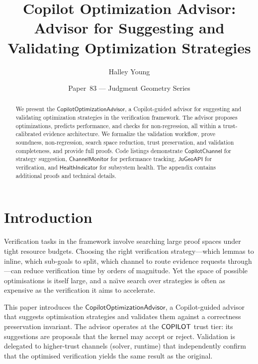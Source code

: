\documentclass[11pt]{article}
\title{\textbf{Copilot Optimization Advisor:\\ Advisor for Suggesting and Validating Optimization Strategies}}
\author{Halley Young}
\date{Paper~83 --- Judgment Geometry Series}
\newcommand{\OptAdv}{\mathsf{CopilotOptimizationAdvisor}}
\newcommand{\CopChan}{\mathsf{CopilotChannel}}
\newcommand{\ChanMon}{\mathsf{ChannelMonitor}}
\newcommand{\HealthInd}{\mathsf{HealthIndicator}}
\newcommand{\JuGeoAPI}{\mathsf{JuGeoAPI}}
\begin{document}
\maketitle

\begin{abstract}
We present the $\OptAdv$, a Copilot-guided advisor for suggesting and validating optimization strategies in the \JuGeo{} verification framework. The advisor proposes optimizations, predicts performance, and checks for non-regression, all within a trust-calibrated evidence architecture. We formalize the validation workflow, prove soundness, non-regression, search space reduction, trust preservation, and validation completeness, and provide full proofs. Code listings demonstrate $\CopChan$ for strategy suggestion, $\ChanMon$ for performance tracking, $\JuGeoAPI$ for verification, and $\HealthInd$ for subsystem health. The appendix contains additional proofs and technical details.
\end{abstract}

\section{Introduction}\label{sec:intro}

Verification tasks in the \JuGeo{} framework involve searching
large proof spaces under tight resource budgets.  Choosing
the right verification strategy---which lemmas to inline,
which sub-goals to split, which channel to route evidence
requests through---can reduce verification time by orders
of magnitude.  Yet the space of possible optimisations is
itself large, and a na\"{\i}ve search over strategies is
often as expensive as the verification it aims to accelerate.

This paper introduces the $\OptAdv$, a Copilot-guided
advisor that suggests optimisation strategies and validates
them against a correctness preservation invariant.  The
advisor operates at the $\mathsf{COPILOT}$ trust tier: its
suggestions are proposals that the kernel may accept or
reject.  Validation is delegated to higher-trust channels
(solver, runtime) that independently confirm that the
optimised verification yields the same result as the
original.
\end{document}
